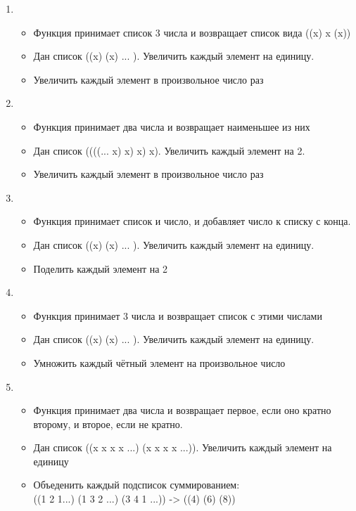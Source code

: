 \documentclass[a4paper,12pt]{article}
\begin{document}
\begin{enumerate}
	\item \begin{itemize}
		\item Функция принимает список 3 числа и возвращает список вида ((x) x (x))
		\item Дан список ((x) (x) ... ). Увеличить каждый элемент на единицу.
		\item Увеличить каждый элемент в произвольное число раз
	\end{itemize}

	\item \begin{itemize}
		\item Функция принимает два числа и возвращает наименьшее из них
		\item Дан список ((((... x) x) x) x). Увеличить каждый элемент на 2.
		\item Увеличить каждый элемент в произвольное число раз
	\end{itemize}

	\item \begin{itemize}
		\item Функция принимает список и число, и добавляет число к списку с конца.
		\item Дан список ((x) (x) ... ). Увеличить каждый элемент на единицу.
		\item Поделить каждый элемент на 2
	\end{itemize}

	\item \begin{itemize}
		\item Функция принимает 3 числа и возвращает список с этими числами
		\item Дан список ((x) (x) ... ). Увеличить каждый элемент на единицу.
		\item Умножить каждый чётный элемент на произвольное число
	\end{itemize}

	\item \begin{itemize}
		\item Функция принимает два числа и возвращает первое, если оно кратно второму, и второе, если не кратно.
		\item Дан список ((x x x x ...) (x x x x ...)). Увеличить каждый элемент на единицу
		\item Объеденить каждый подсписок суммированием:\\((1 2 1...) (1 3 2 ...) (3 4 1 ...)) -> ((4) (6) (8))
	\end{itemize}

\end{enumerate}
\end{document}
